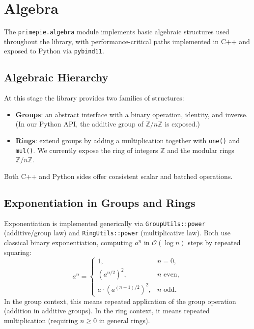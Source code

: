 \section{Algebra}
\label{sec:algebra}

The \texttt{primepie.algebra} module implements basic algebraic structures
used throughout the library, with performance-critical paths implemented in C++
and exposed to Python via \texttt{pybind11}.

\subsection{Algebraic Hierarchy}

At this stage the library provides two families of structures:

\begin{itemize}
  \item \textbf{Groups}: an abstract interface with a binary operation,
        identity, and inverse. (In our Python API, the additive group
        of $\mathbb{Z}/n\mathbb{Z}$ is exposed.)
  \item \textbf{Rings}: extend groups by adding a multiplication together with
        \texttt{one()} and \texttt{mul()}. We currently expose the ring of
        integers $\mathbb{Z}$ and the modular rings $\mathbb{Z}/n\mathbb{Z}$.
\end{itemize}

Both C++ and Python sides offer consistent scalar and batched operations.

\subsection{Exponentiation in Groups and Rings}

Exponentiation is implemented generically via
\texttt{GroupUtils::power} (additive/group law) and
\texttt{RingUtils::power} (multiplicative law). Both use classical
binary exponentiation, computing $a^n$ in $\mathcal{O}(\log n)$ steps by
repeated squaring:
\[
a^n =
\begin{cases}
1, & n = 0,\\
(a^{n/2})^2, & n \text{ even},\\
a \cdot (a^{(n-1)/2})^2, & n \text{ odd}.
\end{cases}
\]
In the group context, this means repeated application of the group operation
(addition in additive groups). In the ring context, it means repeated
multiplication (requiring $n \ge 0$ in general rings).

